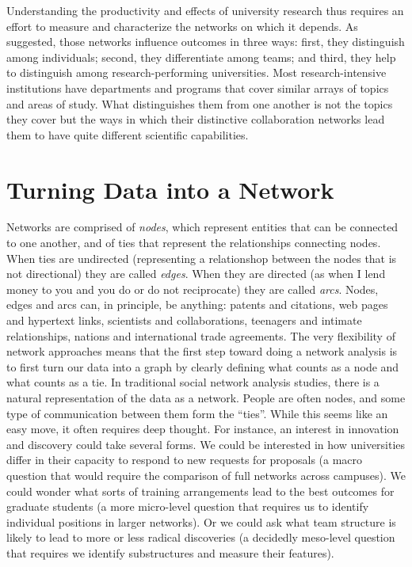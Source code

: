 \documentclass[]{krantz}
\begin{document}
Understanding the productivity and effects of university research thus
requires an effort to measure and characterize the networks on which it
depends. As suggested, those networks influence outcomes in three ways:
first, they distinguish among individuals; second, they differentiate
among teams; and third, they help to distinguish among
research-performing universities. Most research-intensive institutions
have departments and programs that cover similar arrays of topics and
areas of study. What distinguishes them from one another is not the
topics they cover but the ways in which their distinctive collaboration
networks lead them to have quite different scientific capabilities.

\section{Turning Data into a Network}\label{turning-data-into-a-network}

Networks are comprised of \emph{nodes}, which represent entities that
can be connected to one another, and of ties that represent the
relationships connecting nodes. When ties are undirected (representing a
relationshop between the nodes that is not directional) they are called
\emph{edges}. When they are directed (as when I lend money to you and
you do or do not reciprocate) they are called \emph{arcs}. Nodes, edges
and arcs can, in principle, be anything: patents and citations, web
pages and hypertext links, scientists and collaborations, teenagers and
intimate relationships, nations and international trade agreements. The
very flexibility of network approaches means that the first step toward
doing a network analysis is to first turn our data into a graph by
clearly defining what counts as a node and what counts as a tie. In
traditional social network analysis studies, there is a natural
representation of the data as a network. People are often nodes, and
some type of communication between them form the ``ties''. While this
seems like an easy move, it often requires deep thought. For instance,
an interest in innovation and discovery could take several forms. We
could be interested in how universities differ in their capacity to
respond to new requests for proposals (a macro question that would
require the comparison of full networks across campuses). We could
wonder what sorts of training arrangements lead to the best outcomes for
graduate students (a more micro-level question that requires us to
identify individual positions in larger networks). Or we could ask what
team structure is likely to lead to more or less radical discoveries (a
decidedly meso-level question that requires we identify substructures
and measure their features).
\end{document}

